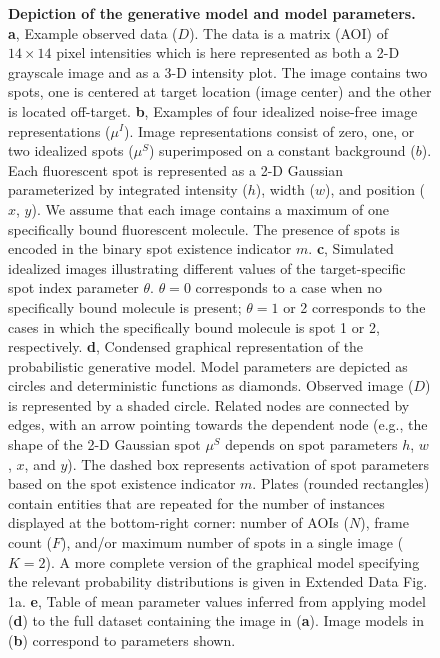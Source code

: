 \begin{figure}[h]
\caption{\textbf{Depiction of the generative model and model parameters.} \textbf{a}, Example observed data ($D$). The data is a matrix (AOI) of $14 \times 14$ pixel intensities which is here represented as both a 2-D grayscale image and as a 3-D intensity plot. The image contains two spots, one is centered at target location (image center) and the other is located off-target. \textbf{b}, Examples of four idealized noise-free image representations ($\mu^I$). Image representations consist of zero, one, or two idealized spots ($\mu^S$) superimposed on a constant background ($b$). Each fluorescent spot is represented as a 2-D Gaussian parameterized by integrated intensity ($h$), width ($w$), and position ($x$, $y$). We assume that each image contains a maximum of one specifically bound fluorescent molecule. The presence of spots is encoded in the binary spot existence indicator $m$. \textbf{c}, Simulated idealized images illustrating different values of the target-specific spot index parameter $\theta$. $\theta = 0$ corresponds to a case when no specifically bound molecule is present; $\theta = 1$ or 2 corresponds to the cases in which the specifically bound molecule is spot 1 or 2, respectively. \textbf{d}, Condensed graphical representation of the probabilistic generative model. Model parameters are depicted as circles and deterministic functions as diamonds. Observed image ($D$) is represented by a shaded circle. Related nodes are connected by edges, with an arrow pointing towards the dependent node (e.g., the shape of the 2-D Gaussian spot $\mu^S$ depends on spot parameters $h$, $w$, $x$, and $y$). The dashed box represents activation of spot parameters based on the spot existence indicator $m$. Plates (rounded rectangles) contain entities that are repeated for the number of instances displayed at the bottom-right corner: number of AOIs ($N$), frame count ($F$), and/or maximum number of spots in a single image ($K=2$). A more complete version of the graphical model specifying the relevant probability distributions is given in Extended Data Fig. 1a. \textbf{e}, Table of mean parameter values inferred from applying model (\textbf{d}) to the full dataset containing the image in (\textbf{a}). Image models in (\textbf{b}) correspond to parameters shown. }
\end{figure}

